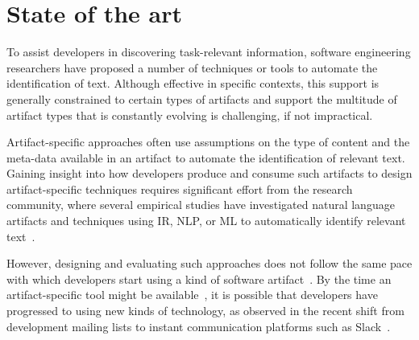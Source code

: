 \section{State of the art}
\label{cp1:novelty}



To assist developers in discovering task-relevant information,
software engineering researchers have proposed 
a number of techniques or tools 
to automate the identification of  text.
Although effective in specific contexts, this support is generally constrained 
to certain
types of artifacts and support the multitude of artifact types that is constantly evolving
is challenging, if not impractical.



Artifact-specific approaches often use assumptions on the type of content 
and the meta-data available in an artifact
to automate the identification of relevant text.
Gaining insight into how developers produce and consume 
such artifacts to design artifact-specific techniques
 requires significant effort from the research community,
 where several empirical studies have investigated 
natural language artifacts 
and techniques using \acf{IR}, \acf{NLP}, or \acf{ML}  to automatically identify
relevant text~\cite{panichella2012, Ko2006, Arya2019, Maalej2013}.


However, designing and evaluating such approaches
does not follow the same pace with which developers start using
a kind of software artifact~\cite{garousi2019}.
By the time an artifact-specific tool might be available~\cite{gibbs1994},
it is possible 
that developers have progressed to using new kinds of technology,
as observed in the recent shift from 
development mailing lists to instant communication platforms such as Slack~\cite{Lin2016}. 








